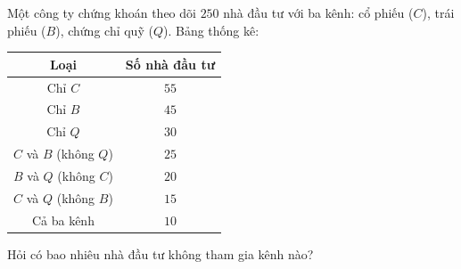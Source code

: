 \begin{bt}%
	Một công ty chứng khoán theo dõi $250$ nhà đầu tư với ba kênh: cổ phiếu ($C$), trái phiếu ($B$), chứng chỉ quỹ ($Q$). Bảng thống kê:
	\begin{center}
		\begin{tabular}{|c|c|}
			\hline
			Loại & Số nhà đầu tư \\
			\hline
			Chỉ $C$ & $55$ \\
			Chỉ $B$ & $45$ \\
			Chỉ $Q$ & $30$ \\
			$C$ và $B$ (không $Q$) & $25$ \\
			$B$ và $Q$ (không $C$) & $20$ \\
			$C$ và $Q$ (không $B$) & $15$ \\
			Cả ba kênh & $10$ \\
			\hline
		\end{tabular}
	\end{center}
	Hỏi có bao nhiêu nhà đầu tư không tham gia kênh nào?
	
\end{bt}

